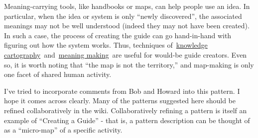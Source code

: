 Meaning-carrying tools, like handbooks or maps, can help people use an
idea. In particular, when the idea or system is only ``newly
discovered'', the associated meanings may not be well understood (indeed
they may not have been created). In such a case, the process of creating
the guide can go hand-in-hand with figuring out how the system works.
Thus, techniques of~\href{http://knowledgecartography.org/}{knowledge
cartography}~and~\href{http://www.hitl.washington.edu/publications/r-97-47/two.html}{meaning
making}~are useful for would-be guide creators. Even so, it is worth
noting that ``the map is not the territory,'' and map-making is only one
facet of shared human activity.

I've tried to incorporate comments from Bob and Howard into this
pattern. I hope it comes across clearly. Many of the patterns suggested
here should be refined collaboratively in the wiki. Collaboratively
refining a pattern is itself an example of ``Creating a Guide'' - that
is, a pattern description can be thought of as a ``micro-map'' of a
specific activity.
